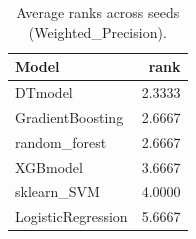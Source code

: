 \begin{table}[t]
\centering
\begin{tabular}{lr}
\toprule
Model & rank \\
\midrule
DTmodel & 2.3333 \\
GradientBoosting & 2.6667 \\
random_forest & 2.6667 \\
XGBmodel & 3.6667 \\
sklearn_SVM & 4.0000 \\
LogisticRegression & 5.6667 \\
\bottomrule
\end{tabular}
\caption{Average ranks across seeds (Weighted_Precision).}
\label{tab:avg_rank_Weighted_Precision}
\end{table}